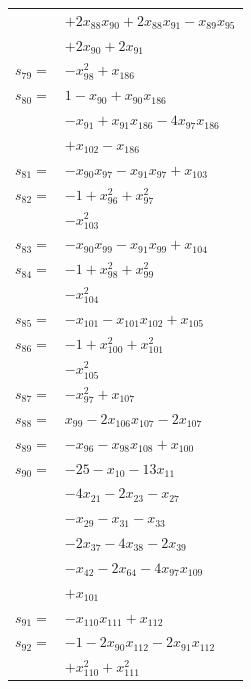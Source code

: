 \begin{longtable}{@{}r@{\;}l@{}}
 & \(\displaystyle +2x_{88}x_{90} +2x_{88}x_{91} -x_{89}x_{95}\) \\
 & \(\displaystyle +2x_{90} +2x_{91}\) \\[3pt]
\(s_{79}=\) & \(\displaystyle -x_{98}^{2} +x_{186}\) \\[3pt]
\(s_{80}=\) & \(\displaystyle 1 -x_{90} +x_{90}x_{186}\) \\
 & \(\displaystyle -x_{91} +x_{91}x_{186} -4x_{97}x_{186}\) \\
 & \(\displaystyle +x_{102} -x_{186}\) \\[3pt]
\(s_{81}=\) & \(\displaystyle -x_{90}x_{97} -x_{91}x_{97} +x_{103}\) \\[3pt]
\(s_{82}=\) & \(\displaystyle -1 +x_{96}^{2} +x_{97}^{2}\) \\
 & \(\displaystyle -x_{103}^{2}\) \\[3pt]
\(s_{83}=\) & \(\displaystyle -x_{90}x_{99} -x_{91}x_{99} +x_{104}\) \\[3pt]
\(s_{84}=\) & \(\displaystyle -1 +x_{98}^{2} +x_{99}^{2}\) \\
 & \(\displaystyle -x_{104}^{2}\) \\[3pt]
\(s_{85}=\) & \(\displaystyle -x_{101} -x_{101}x_{102} +x_{105}\) \\[3pt]
\(s_{86}=\) & \(\displaystyle -1 +x_{100}^{2} +x_{101}^{2}\) \\
 & \(\displaystyle -x_{105}^{2}\) \\[3pt]
\(s_{87}=\) & \(\displaystyle -x_{97}^{2} +x_{107}\) \\[3pt]
\(s_{88}=\) & \(\displaystyle x_{99} -2x_{106}x_{107} -2x_{107}\) \\[3pt]
\(s_{89}=\) & \(\displaystyle -x_{96} -x_{98}x_{108} +x_{100}\) \\[3pt]
\(s_{90}=\) & \(\displaystyle -25 -x_{10} -13x_{11}\) \\
 & \(\displaystyle -4x_{21} -2x_{23} -x_{27}\) \\
 & \(\displaystyle -x_{29} -x_{31} -x_{33}\) \\
 & \(\displaystyle -2x_{37} -4x_{38} -2x_{39}\) \\
 & \(\displaystyle -x_{42} -2x_{64} -4x_{97}x_{109}\) \\
 & \(\displaystyle +x_{101}\) \\[3pt]
\(s_{91}=\) & \(\displaystyle -x_{110}x_{111} +x_{112}\) \\[3pt]
\(s_{92}=\) & \(\displaystyle -1 -2x_{90}x_{112} -2x_{91}x_{112}\) \\
 & \(\displaystyle +x_{110}^{2} +x_{111}^{2}\) \\[3pt]

\end{longtable}
